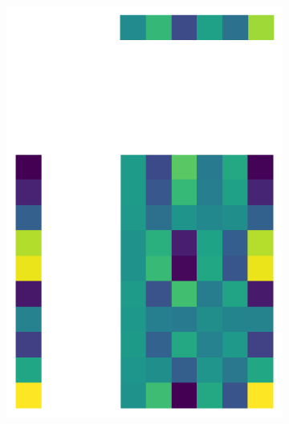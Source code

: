 \documentclass[10pt,twocolumn]{article}
\begin{document}
\begin{figure}[H]
\begin{subfigure}[t]{.15\textwidth}
\centering
\includegraphics[scale=.2]{DWGs/random-matrix-reconstruction-PCs-1.png}
\caption{ }
\end{subfigure}
\begin{subfigure}[t]{.15\textwidth}
\centering

\end{subfigure}
\end{figure}
\end{document}

